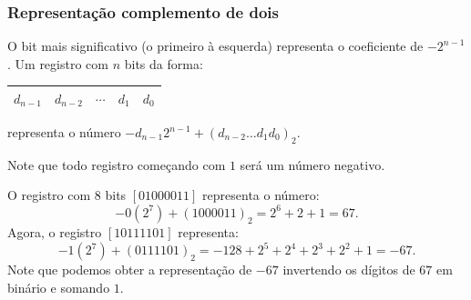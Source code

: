 \subsubsection{Representação complemento de dois}
O bit mais significativo (o primeiro à esquerda) representa o coeficiente de $-2^{n-1}$.  Um registro com $n$ bits da forma:
\begin{center}
  \begin{tabular}{|c|c|c|c|c|} \hline
    $d_{n-1}$ & $d_{n-2}$ & $\cdots$ & $d_1$ & $d_0$\\\hline
  \end{tabular}
\end{center}
representa o número $-d_{n-1}2^{n-1}+(d_{n-2}\ldots d_1d_0)_2$.

\begin{obs}
  Note que todo registro começando com $1$ será um número negativo.
\end{obs}


\begin{ex}
 O registro com $8$ bits $[01000011]$ representa o número:
 \begin{equation*}
   -0(2^7) + (1000011)_2 = 2^6 + 2 + 1 = 67.
 \end{equation*}
 Agora, o registro $[10111101]$ representa:
 \begin{equation*}
   -1(2^7) + (0111101)_2 = -128 + 2^5 + 2^4 + 2^3 + 2^2 + 1 = -67.
 \end{equation*}
 Note que podemos obter a representação de $-67$ invertendo os dígitos de $67$ em binário e somando $1$.
\end{ex}

